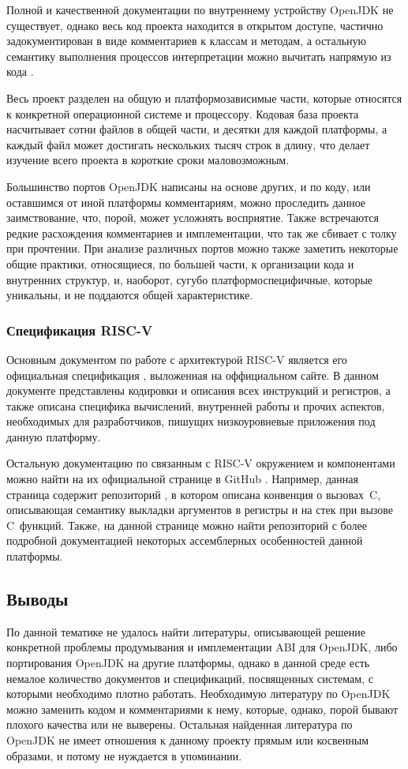 Полной и качественной документации по внутреннему устройству OpenJDK не существует, однако весь код проекта находится в открытом доступе, частично задокументирован в виде комментариев к классам и методам, а остальную семантику выполнения процессов интерпретации можно вычитать напрямую из кода \cite{hotspot}.

Весь проект разделен на общую и платформозависимые части, которые относятся к конкретной операционной системе и процессору. Кодовая база проекта насчитывает сотни файлов в общей части, и десятки для каждой платформы, а каждый файл может достигать нескольких тысяч строк в длину, что делает изучение всего проекта в короткие сроки маловозможным.

Большинство портов OpenJDK написаны на основе других, и по коду, или оставшимся от иной платформы комментариям, можно проследить данное заимствование, что, порой, может усложнять восприятие. Также встречаются редкие расхождения комментариев и имплементации, что так же сбивает с толку при прочтении. При анализе различных портов можно также заметить некоторые общие практики, относящиеся, по большей части, к организации кода и внутренних структур, и, наоборот, сугубо платформоспецифичные, которые уникальны, и не поддаются общей характеристике.


\subsubsection*{Спецификация RISC-V}

Основным документом по работе с архитектурой RISC-V является его официальная спецификация \cite{riscv:spec}, выложенная на оффициальном сайте. В данном документе представлены кодировки и описания всех инструкций и регистров, а также описана специфика вычислений, внутренней работы и прочих аспектов, необходимых для разработчиков, пишущих низкоуровневые приложения под данную платформу. 

Остальную документацию по связанным с RISC-V окружением и компонентами можно найти на их официальной странице в GitHub \cite{riscv:github}. Например, данная страница содержит репозиторий \cite{riscv:convention}, в котором описана конвенция о вызовах~C, описывающая семантику выкладки аргументов в регистры и на стек при вызове C~функций. Также, на данной странице можно найти репозиторий \cite{riscv:asm} с более подробной документацией некоторых ассемблерных особенностей данной платформы.


\subsection*{Выводы}

По данной тематике не удалось найти литературы, описывающей решение конкретной проблемы продумывания и имплементации ABI для OpenJDK, либо портирования OpenJDK на другие платформы, однако в данной среде есть немалое количество документов и спецификаций, посвященных системам, с которыми необходимо плотно работать. Необходимую литературу по OpenJDK можно заменить кодом и комментариями к нему, которые, однако, порой бывают плохого качества или не выверены. Остальная найденная литература по OpenJDK не имеет отношения к данному проекту прямым или косвенным образами, и потому не нуждается в упоминании.
